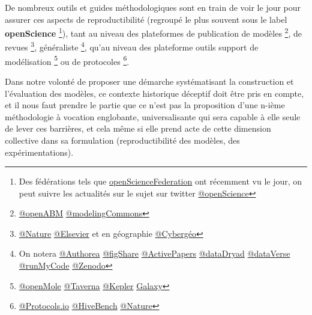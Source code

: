 De nombreux outils et guides méthodologiques \autocite{Prlic2012} \autocite{Bourne2013} \autocite{Goodman2014} \autocite{Sandve2013} sont en train de voir le jour pour assurer ces aspects de reproductibilité (regroupé le plus souvent sous le label \textbf{openScience} \footnote{Des fédérations tels que \href{http://opensciencefederation.com/}{openScienceFederation} ont récemment vu le jour, on peut suivre les actualités sur le sujet sur twitter \href{https://twitter.com/openscience}{@openScience}}), tant au niveau des plateformes de publication de modèles 
\footnote{\href{http://www.openabm.org/}{@openABM} \href{http://modelingcommons.org}{@modelingCommons}}, de revues 
\footnote{\href{http://www.nature.com/scientificdata/about/}{@Nature} \href{http://www.elsevier.com/physical-sciences/computer-science/executable-papers}{@Elsevier} et en géographie \href{http://cybergeo.revues.org/}{@Cybergéo}}, généraliste 
\footnote{On notera \href{https://authorea.com/}{@Authorea} \href{http://figshare.com/}{@figShare} \href{http://www.activepapers.org/}{@ActivePapers} \href{http://datadryad.org/}{@dataDryad} \href{http://http://thedata.org/}{@dataVerse} \href{http://www.runmycode.org/}{@runMyCode} \href{http://zenodo.org/}{@Zenodo}}, qu'au niveau des plateforme outils support de modélisation 
\footnote{\href{http://www.openmole.org/}{@openMole} \href{http://www.taverna.org.uk/}{@Taverna} \href{https://kepler-project.org/}{@Kepler} \href{http://galaxyproject.org/}{Galaxy}} ou de protocoles 
\footnote{\href{http://www.protocols.io/}{@Protocols.io} \href{https://www.hivebench.com/}{@HiveBench} \href{http://www.nature.com/protocolexchange}{@Nature}}. 


Dans notre volonté de proposer une démarche systématisant la construction et l'évaluation des modèles, ce contexte historique déceptif doit être pris en compte, et il nous faut prendre le partie que ce n'est pas la proposition d'une n-ième méthodologie à vocation englobante, universalisante qui sera capable à elle seule de lever ces barrières, et cela même si elle prend acte de cette dimension collective dans sa formulation (reproductibilité des modèles, des expérimentations).

